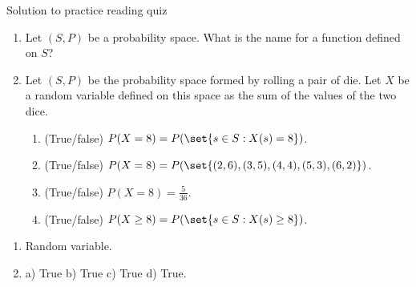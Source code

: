 \documentclass[10pt]{beamer}
\begin{document}
\begin{frame}{Solution to practice reading quiz}
\begin{myredbox}[title=\text{Practice Reading Quiz (Random Variables)}]


\begin{enumerate}
	\item Let $(S,P)$ be a probability space. What is the name for a function defined on $S$?
	\item Let $(S,P)$ be the probability space formed by rolling a pair of die.   Let $X$ be a random variable defined on this space as the sum of the values of the two dice. 
	\begin{enumerate}
	\item[a.] (True/false)  $P(X=8) = P(\set{s \in S : X(s) = 8})$.
	\item[b.] (True/false)  $P(X=8) = P(\set{(2,6), (3,5), (4,4), (5,3), (6,2)})$.
	\item[c.] (True/false)  $P(X=8) = \frac{5}{36}$.
	\item[d.] (True/false)
		$P(X \geq 8) = P(\set{s \in S : X(s) \geq 8})$.
	\end{enumerate}
\end{enumerate}
\end{myredbox}
	
\vfill 
\pause 
\begin{enumerate}
	\item Random variable. \pause 
	\item a) True \pause b) True \pause c) True \pause d) True.
\end{enumerate}
\end{frame}
%
%
%
%  
% 
%
%
%
%
%
%
\end{document}
